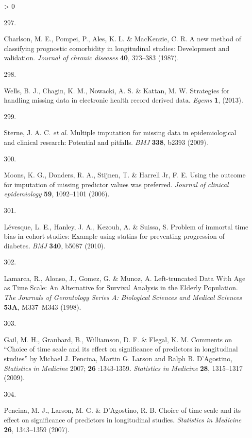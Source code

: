 \documentclass[a4paper, twoside]{templates/ociamthesis}
\newlength{\cslhangindent}
\newlength{\csllabelwidth}
\newenvironment{CSLReferences}[3] %
 {%
  \setlength{\parindent}{0pt}
  \ifodd #1 \everypar{\setlength{\hangindent}{\cslhangindent}}\ignorespaces\fi
  \ifnum #2 > 0
  \setlength{\parskip}{#2\baselineskip}
  \fi
 }%
 {}
\newcommand{\CSLLeftMargin}[1]{\parbox[t]{\maxof{\widthof{#1}}{\csllabelwidth}}{#1}}
\newcommand{\CSLRightInline}[1]{\parbox[t]{\linewidth - \csllabelwidth}{#1}}
\begin{document}
\begin{CSLReferences}{0}{0}
\leavevmode\hypertarget{ref-charlson1987new}{}%
\CSLLeftMargin{297. }
\CSLRightInline{Charlson, M. E., Pompei, P., Ales, K. L. \& MacKenzie, C. R. A new method of classifying prognostic comorbidity in longitudinal studies: Development and validation. \emph{Journal of chronic diseases} \textbf{40}, 373--383 (1987).}

\leavevmode\hypertarget{ref-wells2013strategies}{}%
\CSLLeftMargin{298. }
\CSLRightInline{Wells, B. J., Chagin, K. M., Nowacki, A. S. \& Kattan, M. W. Strategies for handling missing data in electronic health record derived data. \emph{Egems} \textbf{1}, (2013).}

\leavevmode\hypertarget{ref-sterne2009}{}%
\CSLLeftMargin{299. }
\CSLRightInline{Sterne, J. A. C. \emph{et al.} Multiple imputation for missing data in epidemiological and clinical research: Potential and pitfalls. \emph{BMJ} \textbf{338}, b2393 (2009).}

\leavevmode\hypertarget{ref-moons2006}{}%
\CSLLeftMargin{300. }
\CSLRightInline{Moons, K. G., Donders, R. A., Stijnen, T. \& Harrell Jr, F. E. Using the outcome for imputation of missing predictor values was preferred. \emph{Journal of clinical epidemiology} \textbf{59}, 1092--1101 (2006).}

\leavevmode\hypertarget{ref-levesque2010}{}%
\CSLLeftMargin{301. }
\CSLRightInline{Lévesque, L. E., Hanley, J. A., Kezouh, A. \& Suissa, S. Problem of immortal time bias in cohort studies: Example using statins for preventing progression of diabetes. \emph{BMJ} \textbf{340}, b5087 (2010).}

\leavevmode\hypertarget{ref-lamarca1998}{}%
\CSLLeftMargin{302. }
\CSLRightInline{Lamarca, R., Alonso, J., Gomez, G. \& Munoz, A. Left-truncated {Data With Age} as {Time Scale}: An {Alternative} for {Survival Analysis} in the {Elderly Population}. \emph{The Journals of Gerontology Series A: Biological Sciences and Medical Sciences} \textbf{53A}, M337--M343 (1998).}

\leavevmode\hypertarget{ref-gail2009}{}%
\CSLLeftMargin{303. }
\CSLRightInline{Gail, M. H., Graubard, B., Williamson, D. F. \& Flegal, K. M. Comments on {``{Choice} of time scale and its effect on significance of predictors in longitudinal studies''} by {Michael J}. {Pencina}, {Martin G}. {Larson} and {Ralph B}. {D}'{Agostino}, {\emph{Statistics}}{ \emph{in} }{\emph{Medicine}} 2007; {\textbf{26}} :1343-1359. \emph{Statistics in Medicine} \textbf{28}, 1315--1317 (2009).}

\leavevmode\hypertarget{ref-pencina2007}{}%
\CSLLeftMargin{304. }
\CSLRightInline{Pencina, M. J., Larson, M. G. \& D'Agostino, R. B. Choice of time scale and its effect on significance of predictors in longitudinal studies. \emph{Statistics in Medicine} \textbf{26}, 1343--1359 (2007).}


\end{CSLReferences}
\end{document}
